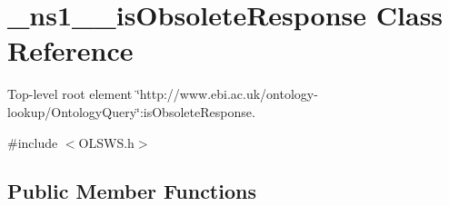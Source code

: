 \hypertarget{class__ns1____isObsoleteResponse}{
\section{\_\-ns1\_\-\_\-isObsoleteResponse Class Reference}
\label{class__ns1____isObsoleteResponse}
}


Top-\/level root element \char`\"{}http://www.ebi.ac.uk/ontology-\/lookup/OntologyQuery\char`\"{}:isObsoleteResponse.  




{\ttfamily \#include $<$OLSWS.h$>$}

\subsection*{Public Member Functions}
